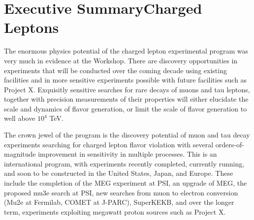 \documentclass{tcibook}
\begin{document}
\def\bibname{References}


\raggedbottom


\parindent=0pt
\parskip=8pt
\setlength{\evensidemargin}{0pt}
\setlength{\oddsidemargin}{0pt}
\setlength{\marginparsep}{0.0in}
\setlength{\marginparwidth}{0.0in}
\marginparpush=0pt



\renewcommand{\chapname}{chap:intro_}
\renewcommand{\chapterdir}{.}
\renewcommand{\arraystretch}{1.25}
\addtolength{\arraycolsep}{-3pt}




\chapter{Executive Summary\break Charged Leptons}
\bigskip\bigskip
The enormous physics potential of the charged
lepton experimental program was very much in evidence at the Workshop. There are discovery opportunities in experiments that will be conducted over the coming decade using existing facilities and in more sensitive experiments possible with future facilities such as Project X.
Exquisitly sensitive searches for rare decays of muons and tau leptons, together with precision measurements of their properties will either elucidate the scale and dynamics of flavor generation, or
limit the scale of flavor generation to well above $10^4$ TeV.  

The crown jewel of the program is the discovery potential of muon and tau decay experiments searching for charged lepton flavor violation with several orders-of-magnitude improvement in sensitivity in
multiple processes.  This is an
international program, with experiments recently completed, currently running, and
soon to be constructed in the United States, Japan, and Europe.  These include the completion of the MEG experiment at PSI, an upgrade of MEG,  the proposed mu3e search at PSI, new searches from muon to electron conversion (Mu2e at Fermilab, COMET at J-PARC), SuperKEKB, and over the longer term, experiments exploiting megawatt proton sources such as Project X.
\end{document}
